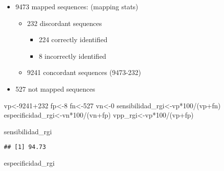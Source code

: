 \documentclass[
]{article}
\newenvironment{Shaded}{\begin{snugshade}}{\end{snugshade}}
\newcommand{\DecValTok}[1]{\textcolor[rgb]{0.00,0.00,0.81}{#1}}
\newcommand{\NormalTok}[1]{#1}
\newcommand{\OtherTok}[1]{\textcolor[rgb]{0.56,0.35,0.01}{#1}}
\newcommand{\SpecialCharTok}[1]{\textcolor[rgb]{0.00,0.00,0.00}{#1}}
\providecommand{\tightlist}{%
  \setlength{\itemsep}{0pt}\setlength{\parskip}{0pt}}
\begin{document}
\begin{itemize}
\tightlist
\item
  9473 mapped sequences: (mapping stats)

  \begin{itemize}
  \tightlist
  \item
    232 discordant sequences

    \begin{itemize}
    \tightlist
    \item
      224 correctly identified\\
    \item
      8 incorrectly identified\\
    \end{itemize}
  \item
    9241 concordant sequences (9473-232)\\
  \end{itemize}
\item
  527 not mapped sequences
\end{itemize}

\begin{Shaded}
\begin{Highlighting}[]
\NormalTok{vp}\OtherTok{\textless{}{-}}\DecValTok{9241}\SpecialCharTok{+}\DecValTok{232}
\NormalTok{fp}\OtherTok{\textless{}{-}}\DecValTok{8}
\NormalTok{fn}\OtherTok{\textless{}{-}}\DecValTok{527}
\NormalTok{vn}\OtherTok{\textless{}{-}}\DecValTok{0}
\NormalTok{sensibilidad\_rgi}\OtherTok{\textless{}{-}}\NormalTok{vp}\SpecialCharTok{*}\DecValTok{100}\SpecialCharTok{/}\NormalTok{(vp}\SpecialCharTok{+}\NormalTok{fn)}
\NormalTok{especificidad\_rgi}\OtherTok{\textless{}{-}}\NormalTok{vn}\SpecialCharTok{*}\DecValTok{100}\SpecialCharTok{/}\NormalTok{(vn}\SpecialCharTok{+}\NormalTok{fp)}
\NormalTok{vpp\_rgi}\OtherTok{\textless{}{-}}\NormalTok{vp}\SpecialCharTok{*}\DecValTok{100}\SpecialCharTok{/}\NormalTok{(vp}\SpecialCharTok{+}\NormalTok{fp)}

\NormalTok{sensibilidad\_rgi}
\end{Highlighting}
\end{Shaded}

\begin{verbatim}
## [1] 94.73
\end{verbatim}

\begin{Shaded}
\begin{Highlighting}[]
\NormalTok{especificidad\_rgi}
\end{Highlighting}
\end{Shaded}
\end{document}
